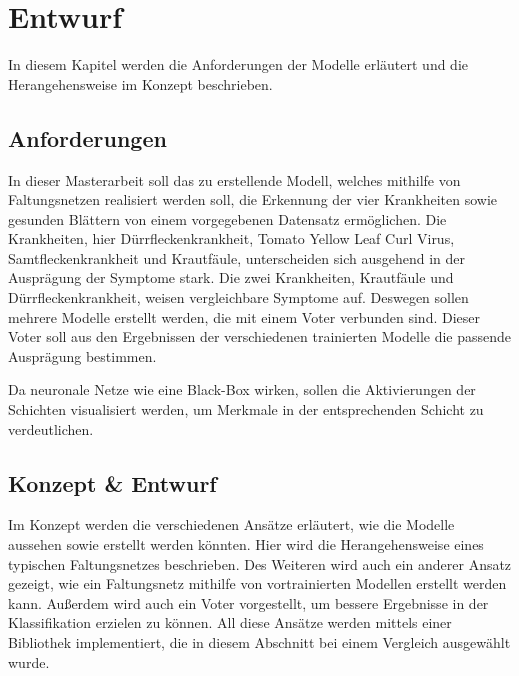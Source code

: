 \chapter{Entwurf}
\label{chapter:entwurf}

In diesem Kapitel werden die Anforderungen der Modelle erläutert und die Herangehensweise im Konzept beschrieben.

\section{Anforderungen}




In dieser Masterarbeit soll das zu erstellende Modell, welches mithilfe von Faltungsnetzen realisiert werden soll, die Erkennung der vier Krankheiten sowie gesunden Blättern von einem vorgegebenen Datensatz ermöglichen. Die Krankheiten, hier Dürrfleckenkrankheit, Tomato Yellow Leaf Curl Virus, Samtfleckenkrankheit und Krautfäule, unterscheiden sich ausgehend in der Ausprägung der Symptome stark. Die zwei Krankheiten, Krautfäule und Dürrfleckenkrankheit, weisen vergleichbare Symptome auf. Deswegen sollen mehrere Modelle erstellt werden, die mit einem Voter verbunden sind. Dieser Voter soll aus den Ergebnissen der verschiedenen trainierten Modelle die passende Ausprägung bestimmen. 

Da neuronale Netze wie eine Black-Box wirken, sollen die Aktivierungen der Schichten visualisiert werden, um Merkmale in der entsprechenden Schicht zu verdeutlichen.

\section{Konzept \& Entwurf}

Im Konzept werden die verschiedenen Ansätze erläutert, wie die Modelle aussehen sowie erstellt werden könnten. Hier wird die Herangehensweise eines typischen Faltungsnetzes beschrieben. Des Weiteren wird auch ein anderer Ansatz gezeigt, wie ein Faltungsnetz mithilfe von vortrainierten Modellen erstellt werden kann. Außerdem wird auch ein Voter vorgestellt, um bessere Ergebnisse in der Klassifikation erzielen zu können. All diese Ansätze werden mittels einer Bibliothek implementiert, die in diesem Abschnitt bei einem Vergleich ausgewählt wurde.

